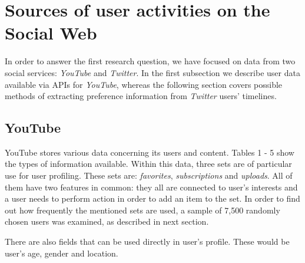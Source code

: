 \section{Sources of user activities on the Social Web}
In order to answer the first research question, we have focused on data from two social services: \textit{YouTube} and \textit{Twitter}. In the first subsection we describe user data available via APIs for \textit{YouTube}, whereas the
following section covers possible methods of extracting preference information from \textit{Twitter} users' timelines.
\subsection{YouTube}
YouTube stores various data concerning its users and content. Tables
1 - 5 show the types of information
available. Within this data, three sets are of particular use for user
profiling. These sets are: \emph{favorites}, \emph{subscriptions} and
\emph{uploads}. All of them have two features in common: they all are connected
to user's interests and a user needs to perform action in order to add an item
to the set. In order to find out how frequently the mentioned sets are used, a
sample of 7,500 randomly chosen users was examined, as described in next section.

There are also fields that can be used directly in user's profile. These would
be user's age, gender and location.

